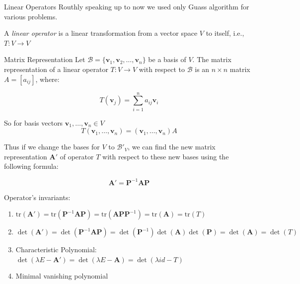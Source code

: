 \documentclass[fullscreen=true, bookmarks=true, hyperref={pdfencoding=unicode}]{beamer}
\begin{document}
\begin{frame}{Linear Operators}
  Routhly speaking up to now we used only Guass algorithm for various problems.
  
  \pause
  A \emph{linear operator} is a linear transformation from 
  a vector space $V$ to itself, i.e., $T: V \rightarrow V$
  
  \begin{block}{Matrix Representation}
  Let $\mathcal{B} = \{\mathbf{v}_1, \mathbf{v}_2, \dots, \mathbf{v}_n\}$ be a basis of $V$. The matrix representation of a linear operator $T: V \rightarrow V$ with respect to $\mathcal{B}$ is an $n \times n$ matrix $A = [a_{ij}]$, where:
  
  \[
  T(\mathbf{v}_j) = \sum_{i=1}^{n} a_{ij} \mathbf{v}_i
  \]
  \end{block}

  So for basis vectors $\mathbf{v}_1, \dots, \mathbf{v}_n \in V$
  $$\boxed{T(\mathbf{v}_1, \dots, \mathbf{v}_n) = (\mathbf{v}_1, \dots, \mathbf{v}_n)A}$$  
\end{frame}


\begin{frame}
  Thus if we change the bases for $V$ to $\mathcal{B}'_V$,  
  we can find the new matrix representation $\mathbf{A}'$ 
  of operator $T$ with respect to these new bases using the following formula:
  
  \[
  \mathbf{A}' = \mathbf{P}^{-1} \mathbf{A} \mathbf{P}
  \]

  \pause
  Operator's invariants:
  \begin{enumerate}
    \pause
    \item $\mathrm{tr} (\mathbf{A}') = 
    \mathrm{tr} (\mathbf{P}^{-1} \mathbf{A} \mathbf{P}) = 
    \mathrm{tr} (\mathbf{A} \mathbf{P} \mathbf{P}^{-1}) =
    \mathrm{tr} (\mathbf{A}) = \mathrm{tr} (T)$
    \pause
    \item $\det (\mathbf{A}') = 
    \det (\mathbf{P}^{-1} \mathbf{A} \mathbf{P}) = 
    \det (\mathbf{P}^{-1}) \det (\mathbf{A}) \det(\mathbf{P}) = 
    \det (\mathbf{A}) = \det ({T})$
    \pause
    \item Characteristic Polynomial: 
    $\det(\lambda E - \mathbf{A}') = \det(\lambda E - \mathbf{A}) = \det(\lambda id - T)$
    \pause
    \item Minimal vanishing polynomial
  \end{enumerate}
\end{frame}
\end{document}

